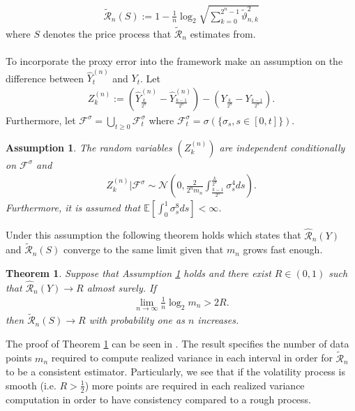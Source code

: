 \documentclass{article}
\newtheorem{theorem}{Theorem}
\newtheorem{assumption}{Assumption}
\begin{document}
\begin{align*}
\widetilde{\mathscr{R}}_n (S) := 1 - \frac{1}{n}\log_2 \sqrt{\sum_{k=0}^{2^n-1}\widetilde{\vartheta}_{n,k}^2}
\end{align*}
where $S$ denotes the price process that $\widetilde{\mathscr{R}}_n$ estimates from. \\\\
To incorporate the proxy error into the framework \cite{han} make an assumption on the difference between $\widehat{Y}_t^{(n)}$ and $Y_t$. Let 
\begin{align*}
Z_k^{(n)} := \left( \widehat{Y}_{\frac{k}{2^{n}}}^{(n)} - \widehat{Y}_{\frac{k-1}{2^{n}}}^{(n)} \right) - \left( Y_{\frac{k}{2^{n}}} - Y_{\frac{k-1}{2^{n}}} \right).
\end{align*}
Furthermore, let $\mathscr{F}^\sigma = \bigcup_{t\geq 0} \mathscr{F}^\sigma_t$ where $\mathscr{F}^\sigma_t = \sigma \left( \{ \sigma_s, s\in [0,t]\}\right)$. 
\begin{assumption}
The random variables $\left( Z_k^{(n)} \right) $ are independent conditionally on $\mathscr{F}^\sigma$ and
\begin{align*}
Z_k^{(n)}\vert \mathscr{F}^\sigma \sim \mathcal{N}\left( 0, \frac{2}{2^n m_n}\int_\frac{k-1}{2^n}^\frac{k}{2^n} \sigma_s^4 ds \right).
\end{align*}
Furthermore, it is assumed that $\mathbb{E}[\int_0^1 \sigma_s^8 ds]<\infty$. \label{as:onlyone}
\end{assumption}
Under this assumption the following theorem holds which states that $\hat{\mathscr{R}}_n (Y)$ and $\widetilde{\mathscr{R}}_n (S)$ converge to the same limit given that $m_n$ grows fast enough.
\begin{theorem}
Suppose that Assumption \ref{as:onlyone} holds and there exist $R\in (0,1)$ such that $\hat{\mathscr{R}}_n (Y)\rightarrow R$ almost surely. If 
\begin{align*}
\lim_{n\rightarrow \infty} \frac{1}{n}\log_2 m_n> 2R.
\end{align*} 
then $\widetilde{\mathscr{R}}_n (S)\rightarrow R$ with probability one as $n$ increases. \label{thm:onlyone}
\end{theorem}
The proof of Theorem \ref{thm:onlyone} can be seen in \cite{han}. The result specifies the number of data points $m_n$ required to compute realized variance in each interval in order for $\widetilde{\mathscr{R}}_n$ to be a consistent estimator. Particularly, we see that if the volatility process is smooth (i.e. $R> \frac{1}{2}$) more points are required in each realized variance computation in order to have consistency compared to a rough process. \\\\
\end{document}
